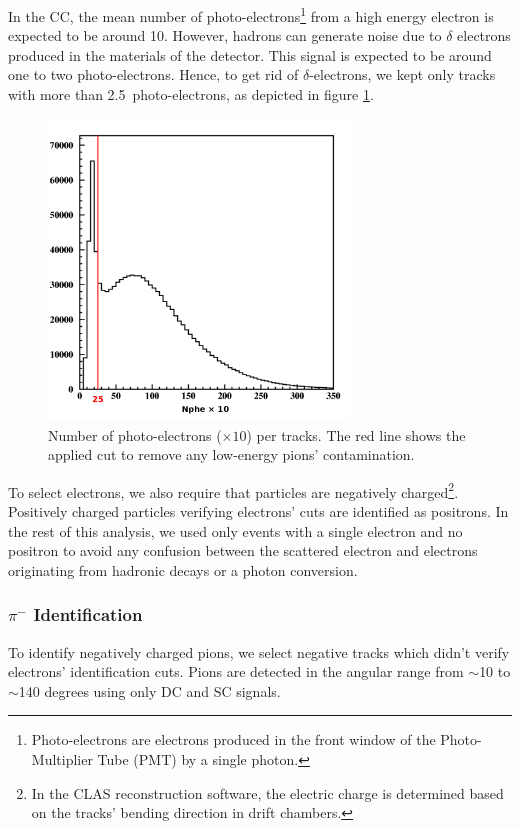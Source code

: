 In the CC, the mean number of photo-electrons\footnote{Photo-electrons are 
electrons produced in the front window of the Photo-Multiplier Tube (PMT) by a single photon.} from a high energy electron is expected to be around 10.
However, hadrons can generate noise due to $\delta$ electrons produced in 
the materials of the detector. This signal is expected to be around 
one to two photo-electrons. Hence, to get rid of $\delta$-electrons, we kept only tracks with more than 2.5~photo-electrons, as depicted in figure \ref{delta}. 

\begin{figure}[tbp]
\centering
\includegraphics[width=8cm] {chap5-fig/fig04.png} 
\caption {Number of photo-electrons ($\times 10$) per tracks. The red line 
shows the applied cut to remove any low-energy pions' contamination.}
\label{delta}
\end{figure}

To select electrons, we also require that particles are negatively charged\footnote{In the CLAS reconstruction software, the electric charge is determined based on the tracks' bending direction in drift chambers.}.
Positively charged particles verifying electrons' cuts are identified as 
positrons. In the rest of this analysis, we used only events with a single electron and no positron to avoid any confusion between the scattered electron and electrons originating from hadronic decays or a photon conversion.

\subsubsection{$\pi^-$ Identification}
\label{PiId}

To identify negatively charged pions, we select negative tracks which didn't verify electrons' identification cuts. Pions are detected in the angular range from $\sim$10 to $\sim$140 degrees using only DC and SC signals.

